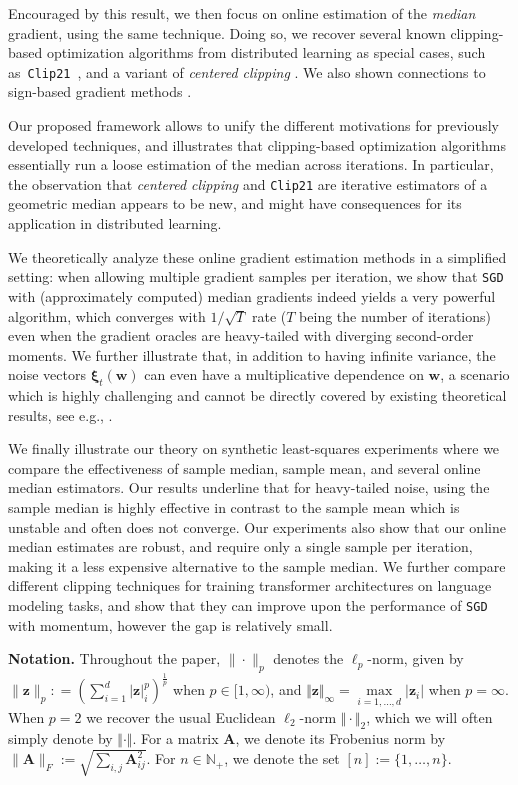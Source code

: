 \documentclass[10pt]{article} %
\renewcommand{\vec}[1]{\bm{#1}}
\newcommand{\norm}[1]{ \|#1 \|}
\newcommand{\ClipTO}{\texttt{Clip21}}
\newcommand{\SGD}{\texttt{SGD}}
\begin{document}
Encouraged by this result, we then focus on online estimation of the \emph{median} gradient, using the same technique. Doing so, we recover several known clipping-based optimization algorithms from distributed learning as special cases, such as~\ClipTO{}~\citep{khirirat2023clip21}, and a variant of \emph{centered clipping} \citep{Karimireddy2021}. We also shown connections to sign-based gradient methods \citep{Riedmiller1993}.

Our proposed framework allows to unify the different motivations for previously developed techniques, and illustrates that clipping-based optimization algorithms essentially run a loose estimation of the median across iterations. In particular, the observation that \emph{centered clipping} and \ClipTO{} are iterative estimators of a geometric median appears to be new, and might have consequences for its application in distributed learning.

We theoretically analyze these online gradient estimation methods in a simplified setting: when allowing multiple gradient samples per iteration, we show that \SGD{} with (approximately computed) median gradients indeed yields a very powerful algorithm, which converges with $1/\sqrt{T}$ rate ($T$ being the number of iterations) even when the gradient oracles are heavy-tailed with diverging second-order moments. We further illustrate that, in addition to having infinite variance, the noise vectors $\vec{\xi}_t(\vec{w})$ can even have a multiplicative dependence on $\vec{w}$, a scenario which is highly challenging and cannot be directly covered by existing theoretical results, see e.g., \citet{wang2021convergence,zhang2020adaptive,Puchkin2023}. 

We finally illustrate our theory on synthetic least-squares experiments where we compare the effectiveness of sample median, sample mean, and several online median estimators. Our results underline that for heavy-tailed noise, using the sample median is highly effective in contrast to the sample mean which is unstable and often does not converge.
Our experiments also show that our online median estimates are robust, 
and require only a single sample per iteration, making it a less expensive alternative to the sample median.
We further compare different clipping techniques for training transformer architectures on language modeling tasks, and show that they can improve upon the performance of \SGD{} with momentum, however the gap is relatively small. 


\textbf{Notation.} Throughout the paper, $\|\cdot\|_p$ denotes the  $\ell_p$-norm, given by $\norm{\vec{z}}_p : = \left( \sum_{i=1}^d|\vec{z}|_i^p \right)^{\frac{1}{p}}$ when $p\in [1,\infty)$, and $\Vert \vec{z} \Vert_\infty = \max\limits_{i=1, \dots, d} \vert \vec{z}_i \vert$ when $p=\infty$. 
When $p=2$ we recover the usual Euclidean $\ell_2$-norm $\Vert \cdot \Vert_2$, which we will often simply denote by $\Vert \cdot \Vert$. For a matrix $\vec{A}$, we denote its Frobenius norm by $\|\vec{A}\|_F := \sqrt{\sum_{i,j}\vec{A}_{ij}^2}$. {For $n \in \mathbb{N}_{+}$, we denote the set $[n]:=\{1,\dots, n\}$.} 
\end{document}
